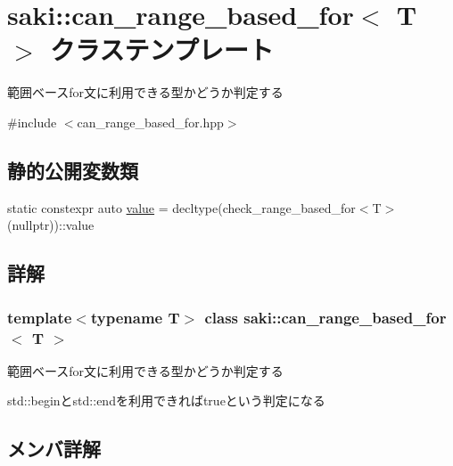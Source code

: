 \hypertarget{classsaki_1_1can__range__based__for}{}\section{saki\+:\+:can\+\_\+range\+\_\+based\+\_\+for$<$ T $>$ クラステンプレート}
\label{classsaki_1_1can__range__based__for}


範囲ベースfor文に利用できる型かどうか判定する  




{\ttfamily \#include $<$can\+\_\+range\+\_\+based\+\_\+for.\+hpp$>$}

\subsection*{静的公開変数類}
\begin{DoxyCompactItemize}
\item 
static constexpr auto \mbox{\hyperlink{classsaki_1_1can__range__based__for_ad9b48de9333c69be9b613f1ccb6b4f13}{value}} = decltype(check\+\_\+range\+\_\+based\+\_\+for$<$T$>$(nullptr))\+::value
\end{DoxyCompactItemize}


\subsection{詳解}
\subsubsection*{template$<$typename T$>$\newline
class saki\+::can\+\_\+range\+\_\+based\+\_\+for$<$ T $>$}

範囲ベースfor文に利用できる型かどうか判定する 

std\+::beginとstd\+::endを利用できればtrueという判定になる 

\subsection{メンバ詳解}
\mbox{\label{classsaki_1_1can__range__based__for_ad9b48de9333c69be9b613f1ccb6b4f13}} 
